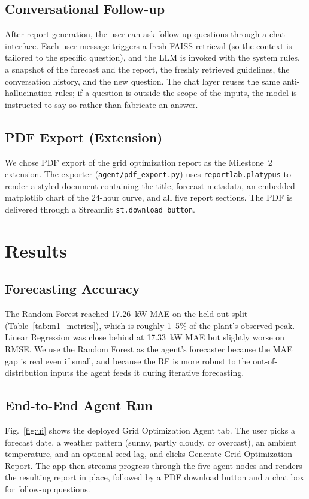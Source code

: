 \documentclass[journal,onecolumn,11pt]{IEEEtran}
\begin{document}
\subsection{Conversational Follow-up}
After report generation, the user can ask follow-up questions through a chat interface. Each user message triggers a fresh FAISS retrieval (so the context is tailored to the specific question), and the LLM is invoked with the system rules, a snapshot of the forecast and the report, the freshly retrieved guidelines, the conversation history, and the new question. The chat layer reuses the same anti-hallucination rules; if a question is outside the scope of the inputs, the model is instructed to say so rather than fabricate an answer.

\subsection{PDF Export (Extension)}
We chose PDF export of the grid optimization report as the Milestone~2 extension. The exporter (\texttt{agent/pdf\_export.py}) uses \texttt{reportlab.platypus} to render a styled document containing the title, forecast metadata, an embedded matplotlib chart of the 24-hour curve, and all five report sections. The PDF is delivered through a Streamlit \texttt{st.download\_button}.

\section{Results}

\subsection{Forecasting Accuracy}
The Random Forest reached 17.26~kW MAE on the held-out split (Table~\ref{tab:m1_metrics}), which is roughly 1--5\% of the plant's observed peak. Linear Regression was close behind at 17.33~kW MAE but slightly worse on RMSE. We use the Random Forest as the agent's forecaster because the MAE gap is real even if small, and because the RF is more robust to the out-of-distribution inputs the agent feeds it during iterative forecasting.

\subsection{End-to-End Agent Run}
Fig.~\ref{fig:ui} shows the deployed Grid Optimization Agent tab. The user picks a forecast date, a weather pattern (sunny, partly cloudy, or overcast), an ambient temperature, and an optional seed lag, and clicks \textsf{Generate Grid Optimization Report}. The app then streams progress through the five agent nodes and renders the resulting report in place, followed by a PDF download button and a chat box for follow-up questions.
\end{document}
